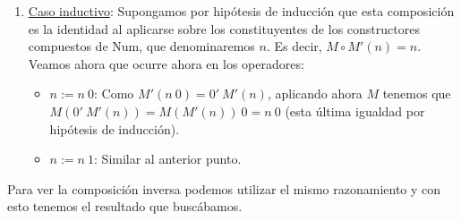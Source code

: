 \begin{sol}
\begin{enumerate}
        \item \underline{Caso inductivo}: Supongamos por hipótesis de inducción
            que esta composición es la identidad al aplicarse sobre los
            constituyentes de los constructores compuestos de $\mathrm{Num}$,
            que denominaremos $n$. Es decir, $M \circ M' \left( n \right) = n$.
            Veamos ahora que ocurre ahora en los operadores:
            \begin{itemize}
                \item \underline{$n := n\ 0$}: Como $M'\left( n\ 0 \right) = 0'\ M'\left( n
                    \right)$, aplicando ahora $M$ tenemos que $M\left( 0'\
                    M'\left( n \right) \right) = M\left( M'\left( n \right)
                    \right)\ 0 = n\ 0$ (esta última igualdad por hipótesis de
                    inducción).

                \item \underline{$n := n\ 1$}: Similar al anterior punto.
            \end{itemize}
    \end{enumerate}
    Para ver la composición inversa podemos utilizar el mismo razonamiento y con
    esto tenemos el resultado que buscábamos.
\end{sol}


